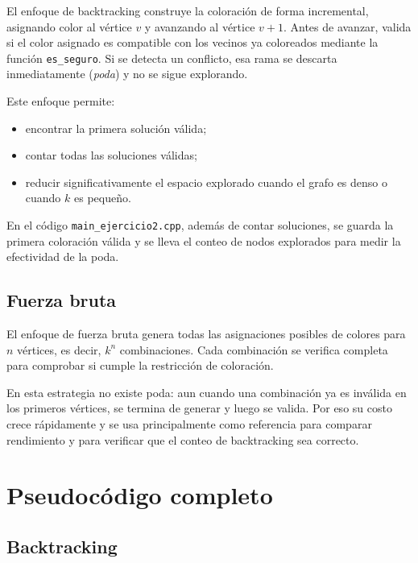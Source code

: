 \documentclass[12pt,a4paper]{article}
\begin{document}
El enfoque de backtracking construye la coloración de forma incremental,
asignando color al vértice \(v\) y avanzando al vértice \(v+1\). Antes de
avanzar, valida si el color asignado es compatible con los vecinos ya
coloreados mediante la función \texttt{es\_seguro}. Si se detecta un conflicto,
esa rama se descarta inmediatamente (\textit{poda}) y no se sigue explorando.

Este enfoque permite:
\begin{itemize}
  \item encontrar la primera solución válida;
  \item contar todas las soluciones válidas;
  \item reducir significativamente el espacio explorado cuando el grafo es
  denso o cuando \(k\) es pequeño.
\end{itemize}

En el código \texttt{main\_ejercicio2.cpp}, además de contar soluciones,
se guarda la primera coloración válida y se lleva el conteo de nodos explorados
para medir la efectividad de la poda.

\subsection{Fuerza bruta}

El enfoque de fuerza bruta genera todas las asignaciones posibles de colores
para \(n\) vértices, es decir, \(k^n\) combinaciones. Cada combinación se
verifica completa para comprobar si cumple la restricción de coloración.

En esta estrategia no existe poda: aun cuando una combinación ya es inválida en
los primeros vértices, se termina de generar y luego se valida. Por eso su costo
crece rápidamente y se usa principalmente como referencia para comparar
rendimiento y para verificar que el conteo de backtracking sea correcto.

\section{Pseudocódigo completo}

\subsection{Backtracking}
\end{document}
